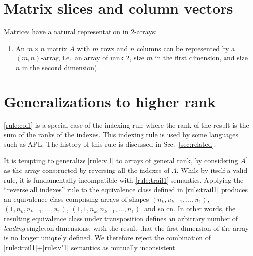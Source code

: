 \section{Matrix slices and column vectors}

Matrices have a natural representation in 2-arrays:

\begin{enumerate}[label=\bfseries{}M\arabic*]
\item An $m \times n$ matrix $A$ with $m$ rows and $n$ columns can be
	represented by a $(m,n)$-array, i.e.\ an array of rank 2, size $m$ in
	the first dimension, and size $n$ in the second
	dimension).\label{rule:mat}
\end{enumerate}



\section{Generalizations to higher rank}

\ref{rule:col1} is a special case of the indexing rule where the rank of the
result is the sum of the ranks of the indexes. This indexing rule is used by
some languages such as APL. The history of this rule is discussed in
Sec.~\ref{sec:related}.

It is tempting to generalize \ref{rule:v'1} to arrays of general rank, by
considering $A^\prime$ as the array constructed by reversing all the indexes of
$A$. While by itself a valid rule, it is fundamentally incompatible with
\ref{rule:trail1} semantics. Applying the ``reverse all indexes'' rule to the
equivalence class defined in \ref{rule:trail1} produces an equivalence class
comprising arrays of shapes $(n_k, n_{k-1}, \dots, n_1)$, $(1, n_k, n_{k-1},
\dots, n_1)$, $(1, 1, n_k, n_{k-1}, \dots, n_1)$, and so on. In other words,
the resulting equivalence class under transposition defines an arbitrary number
of \textit{leading} singleton dimensions, with the result that the first
dimension of the array is no longer uniquely defined. We therefore reject the
combination of \ref{rule:trail1}+\ref{rule:v'1} semantics as mutually
inconsistent.



